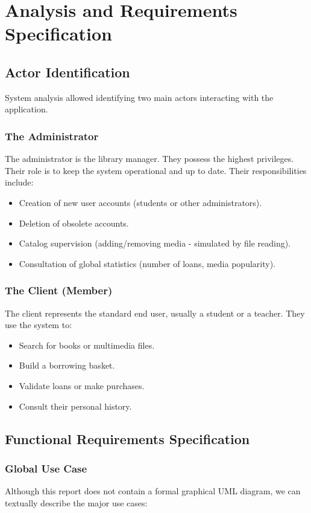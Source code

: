 \documentclass[12pt,a4paper]{report}
\begin{document}
\chapter{Analysis and Requirements Specification}

\section{Actor Identification}
System analysis allowed identifying two main actors interacting with the application.

\subsection{The Administrator}
The administrator is the library manager. They possess the highest privileges. Their role is to keep the system operational and up to date.
Their responsibilities include:
\begin{itemize}
    \item Creation of new user accounts (students or other administrators).
    \item Deletion of obsolete accounts.
    \item Catalog supervision (adding/removing media - simulated by file reading).
    \item Consultation of global statistics (number of loans, media popularity).
\end{itemize}

\subsection{The Client (Member)}
The client represents the standard end user, usually a student or a teacher.
They use the system to:
\begin{itemize}
    \item Search for books or multimedia files.
    \item Build a borrowing basket.
    \item Validate loans or make purchases.
    \item Consult their personal history.
\end{itemize}

\section{Functional Requirements Specification}

\subsection{Global Use Case}
Although this report does not contain a formal graphical UML diagram, we can textually describe the major use cases:
\end{document}
